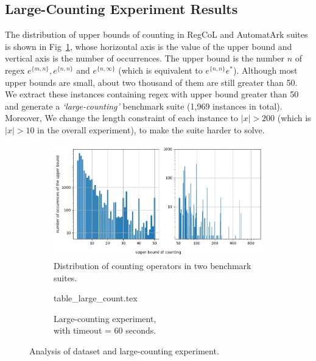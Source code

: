 \vspace{-2mm}
\subsection{Large-Counting Experiment Results}
\vspace{-1mm}
The distribution of upper bounds of counting in RegCoL and AutomatArk suites is shown in Fig~\ref{fig:count_distri}, whose horizontal axis is the value of the upper bound and vertical axis is the number of occurrences. The upper bound is the number $n$ of regex $e^{\{m,n\}}, e^{\{n,n\}}$ and $e^{\{n,\infty\}}$ (which is equivalent to $e^{\{n,n\}}e^*$). Although most upper bounds are small, about two thousand of them are still greater than 50. We extract these instances containing regex with upper bound greater than 50 and generate a \emph{`large-counting'} benchmark suite (1,969 instances in total). Moreover, We change the length constraint of each instance to $|x| > 200$ (which is $|x| > 10$ in the overall experiment), to make the suite harder to solve.
\vspace{-5mm}
\begin{figure}[ht]
  \centering
  \begin{subfigure}[t]{0.49\textwidth}
    \centering\vskip 0pt
    \includegraphics[width=1\textwidth]{counting_distribution.png}  
    \caption{Distribution of counting operators in two benchmark suites.}  
    \label{fig:count_distri}
  \end{subfigure}
  \hfill
  \begin{subfigure}[t]{0.49\textwidth}
    \centering\vskip 0pt
    {table_large_count.tex}
    \vspace{4.5mm}
    \caption{Large-counting experiment, \\with timeout = 60 seconds.}
    \label{fig:table_large_count}
  \end{subfigure}
  \vspace{-2mm}
  \caption{Analysis of dataset and large-counting experiment.}
\end{figure}
\vspace{-5mm}

